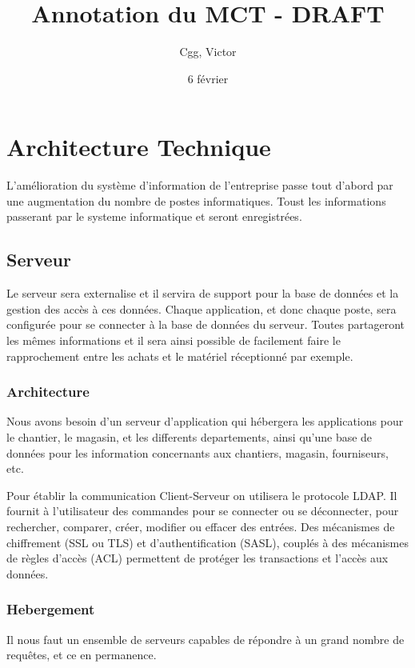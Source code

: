 \documentclass[a4paper]{article}
\title{Annotation du MCT - DRAFT}
\author{Cgg, Victor}
\date{6 février}
\begin{document}
\section{Architecture Technique}
L’amélioration du système d’information de l’entreprise passe tout d’abord par une augmentation du nombre de postes
informatiques. Toust les informations passerant par le systeme informatique et seront enregistrées.




\subsection{Serveur}

Le serveur sera externalise et il servira de support pour la base de données et la gestion des accès à ces données. 
Chaque application, et donc chaque poste, sera configurée pour se connecter à la base de données du serveur. 
Toutes partageront les mêmes informations et il sera ainsi possible de facilement faire le rapprochement entre 
les achats et le matériel réceptionné par exemple.

	\subsubsection{Architecture}
Nous avons besoin d'un serveur d'application qui hébergera les applications pour le chantier, le magasin, et les differents 
departements,  ainsi qu'une base de données pour les information concernants aux chantiers, magasin, fourniseurs, etc. 

Pour établir la communication Client-Serveur on utilisera le protocole LDAP. Il fournit à l'utilisateur des commandes 
pour se connecter ou se déconnecter,  pour rechercher, comparer, créer, modifier ou effacer des entrées. 
Des mécanismes de chiffrement (SSL ou TLS) et d'authentification (SASL), couplés à des mécanismes de règles d'accès (ACL) 
permettent de protéger les transactions et l'accès aux données.

	\subsubsection{Hebergement}
    Il nous faut un ensemble de serveurs capables de répondre à un grand
    nombre de requêtes, et ce en permanence.
\end{document}
